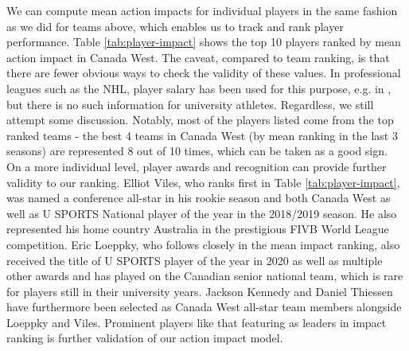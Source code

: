 \documentclass{sfuthesis}
\begin{document}
	We can compute mean action impacts for individual players in the same fashion as we did for teams above, which enables us to track and rank player performance. Table \ref{tab:player-impact} shows the top 10 players ranked by mean action impact in Canada West. The caveat, compared to team ranking, is that there are fewer obvious ways to check the validity of these values. In professional leagues such as the NHL, player salary has been used for this purpose, e.g. in \cite{schulte2017apples}, but there is no such information for university athletes. Regardless, we still attempt some discussion. Notably, most of the players listed come from the top ranked teams - the best 4 teams in Canada West (by mean ranking in the last 3 seasons) are represented 8 out of 10 times, which can be taken as a good sign.\\
	On a more individual level, player awards and recognition can provide further validity to our ranking. Elliot Viles, who ranks first in Table \ref{tab:player-impact}, was named a conference all-star in his rookie season and both Canada West as well as U SPORTS National player of the year in the 2018/2019 season. He also represented his home country Australia in the prestigious FIVB World League competition. Eric Loeppky, who follows closely in the mean impact ranking, also received the title of U SPORTS player of the year in 2020 as well as multiple other awards and has played on the Canadian senior national team, which is rare for players still in their university years. Jackson Kennedy and Daniel Thiessen have furthermore been selected as Canada West all-star team members alongside Loeppky and Viles. Prominent players like that featuring as leaders in impact ranking is further validation of our action impact model.
\end{document}
